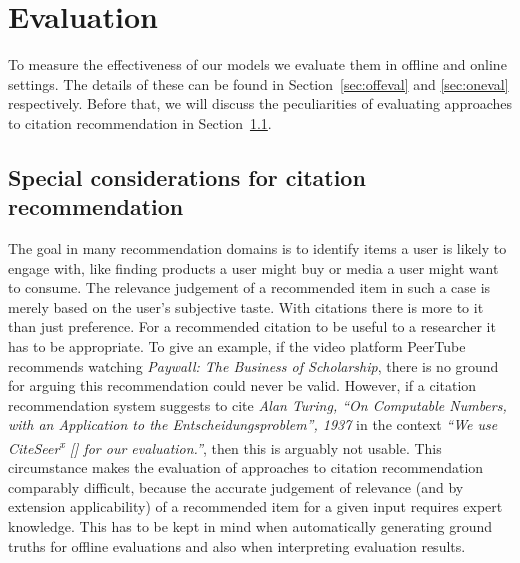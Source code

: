 \chapter{Evaluation}\label{chap:evaluation}
To measure the effectiveness of our models we evaluate them in offline and online settings. The details of these can be found in Section~\ref{sec:offeval} and \ref{sec:oneval} respectively. Before that, we will discuss the peculiarities of evaluating approaches to citation recommendation in Section~\ref{sec:citrecspecial}.

\section{Special considerations for citation recommendation}\label{sec:citrecspecial}
The goal in many recommendation domains is to identify items a user is likely to engage with, like finding products a user might buy or media a user might want to consume. The relevance judgement of a recommended item in such a case is merely based on the user's subjective taste.
With citations there is more to it than just preference. For a recommended citation to be useful to a researcher it has to be appropriate. To give an example, if the video platform PeerTube recommends watching \emph{Paywall: The Business of Scholarship}, there is no ground for arguing this recommendation could never be valid. However, if a citation recommendation system suggests to cite \emph{Alan Turing, ``On Computable Numbers, with an Application to the Entscheidungsproblem'', 1937} in the context \emph{``We use CiteSeer\textsuperscript{x} [] for our evaluation.''}, then this is arguably not usable. This circumstance makes the evaluation of approaches to citation recommendation comparably difficult, because the accurate judgement of relevance (and by extension applicability) of a recommended item for a given input requires expert knowledge. This has to be kept in mind when automatically generating ground truths for offline evaluations and also when interpreting evaluation results.


